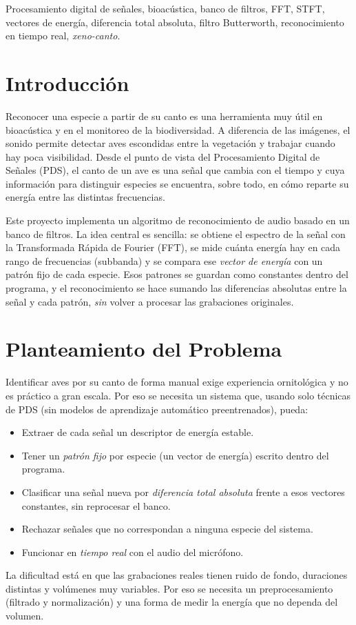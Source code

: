 \documentclass[conference]{IEEEtran}
\begin{document}
\begin{IEEEkeywords}
Procesamiento digital de señales, bioacústica, banco de filtros, FFT, STFT,
vectores de energía, diferencia total absoluta, filtro Butterworth,
reconocimiento en tiempo real, \textit{xeno-canto}.
\end{IEEEkeywords}

\section{Introducción}
Reconocer una especie a partir de su canto es una herramienta muy útil en
bioacústica y en el monitoreo de la biodiversidad. A diferencia de las imágenes,
el sonido permite detectar aves escondidas entre la vegetación y trabajar cuando
hay poca visibilidad. Desde el punto de vista del Procesamiento Digital de Señales
(PDS), el canto de un ave es una señal que cambia con el tiempo y cuya información
para distinguir especies se encuentra, sobre todo, en cómo reparte su energía
entre las distintas frecuencias.

Este proyecto implementa un algoritmo de reconocimiento de audio basado en un
banco de filtros. La idea central es sencilla: se obtiene el espectro de la señal
con la Transformada Rápida de Fourier (FFT), se mide cuánta energía hay en cada
rango de frecuencias (subbanda) y se compara ese \emph{vector de energía} con un
patrón fijo de cada especie. Esos patrones se guardan como constantes dentro del
programa, y el reconocimiento se hace sumando las diferencias absolutas entre la
señal y cada patrón, \emph{sin} volver a procesar las grabaciones originales.

\section{Planteamiento del Problema}\label{sec:problema}
Identificar aves por su canto de forma manual exige experiencia ornitológica y no
es práctico a gran escala. Por eso se necesita un sistema que, usando solo
técnicas de PDS (sin modelos de aprendizaje automático preentrenados), pueda:
\begin{itemize}
  \item Extraer de cada señal un descriptor de energía estable.
  \item Tener un \emph{patrón fijo} por especie (un vector de energía) escrito
        dentro del programa.
  \item Clasificar una señal nueva por \emph{diferencia total absoluta} frente a
        esos vectores constantes, sin reprocesar el banco.
  \item Rechazar señales que no correspondan a ninguna especie del sistema.
  \item Funcionar en \emph{tiempo real} con el audio del micrófono.
\end{itemize}
La dificultad está en que las grabaciones reales tienen ruido de fondo,
duraciones distintas y volúmenes muy variables. Por eso se necesita un
preprocesamiento (filtrado y normalización) y una forma de medir la energía que
no dependa del volumen.
\end{document}

